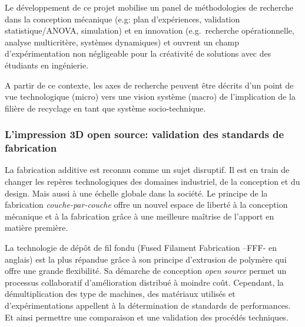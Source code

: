 \documentclass[
  11pt,
]{article}
\begin{document}
Le développement de ce projet mobilise un panel de méthodologies de
recherche dans la conception mécanique (e.g: plan d'expériences,
validation statistique/ANOVA, simulation) et en innovation
(e.g.~recherche opérationnelle, analyse multicritère, systèmes
dynamiques) et ouvrent un champ d'expérimentation non négligeable pour
la créativité de solutions avec des étudiants en ingénierie.

A partir de ce contexte, les axes de recherche peuvent être décrits d'un
point de vue technologique (micro) vers une vision système (macro) de
l'implication de la filière de recyclage en tant que système
socio-technique.

\hypertarget{limpression-3d-open-source-validation-des-standards-de-fabrication}{%
\subsubsection{L'impression 3D open source: validation des standards de
fabrication}\label{limpression-3d-open-source-validation-des-standards-de-fabrication}}

La fabrication additive est reconnu comme un sujet disruptif. Il est en
train de changer les repères technologiques des domaines industriel, de
la conception et du design. Mais aussi à une échelle globale dans la
société. Le principe de la fabrication \emph{couche-par-couche} offre un
nouvel espace de liberté à la conception mécanique et à la fabrication
grâce à une meilleure maîtrise de l'apport en matière première.

La technologie de dépôt de fil fondu (Fused Filament Fabrication --FFF-
en anglais) est la plus répandue grâce à son principe d'extrusion de
polymère qui offre une grande flexibilité. Sa démarche de conception
\emph{open source} permet un processus collaboratif d'amélioration
distribué à moindre coût. Cependant, la démultiplication des type de
machines, des matériaux utilisés et d'expérimentations appellent à la
détermination de standards de performances. Et ainsi permettre une
comparaison et une validation des procédés techniques.
\end{document}
